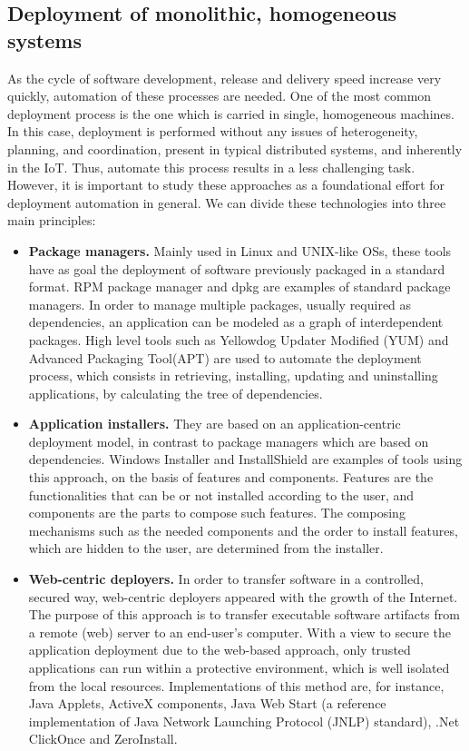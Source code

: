\subsection{Deployment of monolithic, homogeneous systems}
\label{subsec:singleDeployment}
As the cycle of software development, release and delivery speed increase very quickly, automation of these processes are needed.
One of the most common deployment process is the one which is carried in single, homogeneous machines.
In this case, deployment is performed without any issues of heterogeneity, planning, and coordination, present in typical distributed systems, and inherently in the IoT.
Thus, automate this process results in a less challenging task.
However, it is important to study these approaches as a foundational effort for deployment automation in general.
We can divide these technologies into three main principles:
\begin{itemize}
	\item \textbf{Package managers.} Mainly used in Linux and UNIX-like OSs, these tools have as goal the deployment of software previously packaged in a standard format. 
	RPM package manager and dpkg are examples of standard package managers.
	In order to manage multiple packages, usually required as dependencies, an application can be modeled as a graph of interdependent packages.
	High level tools such as Yellowdog Updater Modified (YUM) and Advanced Packaging Tool(APT) are used to automate the deployment process, which consists in retrieving, installing, updating and uninstalling applications, by calculating the tree of dependencies.
	\item \textbf{Application installers.} They are based on an application-centric deployment model, in contrast to package managers which are based on dependencies.
	Windows Installer and InstallShield are examples of tools using this approach, on the basis of features and components.
	Features are the functionalities that can be or not installed according to the user, and components are the parts to compose such features.
	The composing mechanisms such as the needed components and the order to install features, which are hidden to the user, are determined from the installer.
	\item \textbf{Web-centric deployers.} In order to transfer software in a controlled, secured way, web-centric deployers appeared with the growth of the Internet.
	The purpose of this approach is to transfer executable software artifacts from a remote (web) server to an end-user's computer.
	With a view to secure the application deployment due to the web-based approach, only trusted applications can run within a protective environment, which is well isolated from the local resources.
	Implementations of this method are, for instance, Java Applets, ActiveX components, Java Web Start (a reference implementation of Java Network Launching Protocol (JNLP) standard), .Net ClickOnce and ZeroInstall.
\end{itemize}
